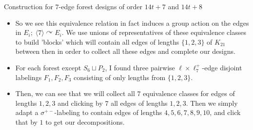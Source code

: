 \documentclass{beamer}
\theoremstyle{plain}
\begin{document}
\begin{frame}{Construction for $7$-edge forest designs of order $14t+7$ and $14t+8$}
    \begin{itemize}
    \item So we see this equivalence relation in fact induces a group action on the edges in $E_{i};\;\langle 7 \rangle \curvearrowright E_{i}$.  We use unions of representatives of these equivalence classes to build 'blocks' which will contain all edges of lengths $\{1,2,3\}$ of $K_{21}$ between then in order to collect all these edges and complete our designs. 
    \item For each forest except $S_{6}\sqcup P_{2}$, I found three pairwise $\ell\times \ell^{+}_{7}$-edge disjoint labelings $F_{1},F_{2},F_{3}$ consisting of only lengths from $\{1,2,3\}$.
    \item Then, we can see that we will collect all $7$ equivalence classes for edges of lengths $1,2,3$ and clicking by $7$ all edges of lengths $1,2,3$. Then we simply adapt a $\sigma^{+-}$-labeling to contain edges of lengths $4,5,6,7,8,9,10$, and click that by $1$ to get our decompositions.
    \end{itemize}

\end{frame}
\end{document}
